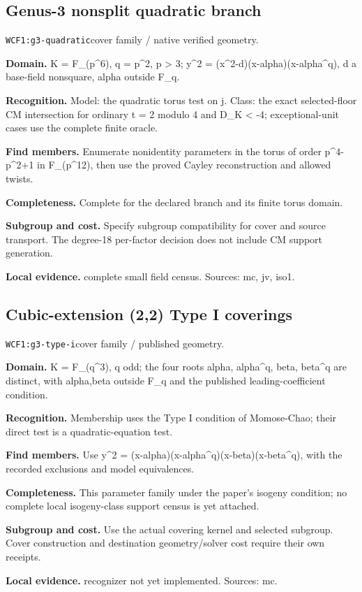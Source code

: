 \documentclass[10pt]{article}
\begin{document}
\subsection{Genus-3 nonsplit quadratic branch}
\texttt{WCF1:g3-quadratic}\quad cover family / native verified geometry.\par
\textbf{Domain.} K = F\_(p\textasciicircum{}6), q = p\textasciicircum{}2, p > 3; y\textasciicircum{}2 = (x\textasciicircum{}2-d)(x-alpha)(x-alpha\textasciicircum{}q), d a base-field nonsquare, alpha outside F\_q.\par
\textbf{Recognition.} Model: the quadratic torus test on j. Class: the exact selected-floor CM intersection for ordinary t = 2 modulo 4 and D\_K < -4; exceptional-unit cases use the complete finite oracle.\par
\textbf{Find members.} Enumerate nonidentity parameters in the torus of order p\textasciicircum{}4-p\textasciicircum{}2+1 in F\_(p\textasciicircum{}12), then use the proved Cayley reconstruction and allowed twists.\par
\textbf{Completeness.} Complete for the declared branch and its finite torus domain.\par
\textbf{Subgroup and cost.} Specify subgroup compatibility for cover and source transport. The degree-18 per-factor decision does not include CM support generation.\par
\textbf{Local evidence.} complete small field census. Sources: mc, jv, iso1.
\subsection{Cubic-extension (2,2) Type I coverings}
\texttt{WCF1:g3-type-i}\quad cover family / published geometry.\par
\textbf{Domain.} K = F\_(q\textasciicircum{}3), q odd; the four roots alpha, alpha\textasciicircum{}q, beta, beta\textasciicircum{}q are distinct, with alpha,beta outside F\_q and the published leading-coefficient condition.\par
\textbf{Recognition.} Membership uses the Type I condition of Momose-Chao; their direct test is a quadratic-equation test.\par
\textbf{Find members.} Use y\textasciicircum{}2 = (x-alpha)(x-alpha\textasciicircum{}q)(x-beta)(x-beta\textasciicircum{}q), with the recorded exclusions and model equivalences.\par
\textbf{Completeness.} This parameter family under the paper's isogeny condition; no complete local isogeny-class support census is yet attached.\par
\textbf{Subgroup and cost.} Use the actual covering kernel and selected subgroup. Cover construction and destination geometry/solver cost require their own receipts.\par
\textbf{Local evidence.} recognizer not yet implemented. Sources: mc.
\end{document}
